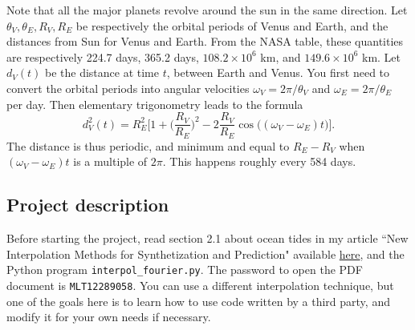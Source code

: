 \documentclass[oneside,10pt]{book}
\begin{document}
Note that all the major planets revolve around the sun in the same direction. 
Let $\theta_V, \theta_E, R_V, R_E$ be respectively the orbital periods of Venus and Earth, and the  distances from Sun for Venus and Earth.  From the NASA table, these quantities are respectively 224.7 days, 365.2 days, $108.2\times 10^6$ km, and 
$149.6  \times 10^6$ km. Let $d_V(t)$ be the distance at time $t$, between Earth and Venus. You first need to convert the orbital periods into angular velocities 
 $\omega_V = 2\pi/\theta_V$ and $\omega_E = 2\pi/\theta_E$ per day.  Then elementary trigonometry leads to the formula
\begin{equation}
d_V^2(t) = R_E^2\Bigg[1 + \Big(\frac{R_V}{R_E}\Big)^2 -2\frac{R_V}{R_E} \cos\Big((\omega_V-\omega_E)t\Big) \Bigg]. \label{resw}
\end{equation}
The distance is thus periodic, and minimum and equal to $R_E - R_V$ when  
$(\omega_V-\omega_E)t$ is a multiple of $2\pi$. This happens roughly every 584 days. 


\subsection{Project description} 

Before starting the project, read section 2.1 about ocean tides in my article 
``New Interpolation Methods  for Synthetization and Prediction" available \href{https://mltblog.com/3Xhm9v9}{here}, and
 the Python program \texttt{interpol\_fourier.py}. The password to open the PDF document is \texttt{MLT12289058}. You can use a different interpolation technique, 
but one of the goals here is to learn how to use code written by a third party, and modify it for your own needs if necessary.  
\end{document}

